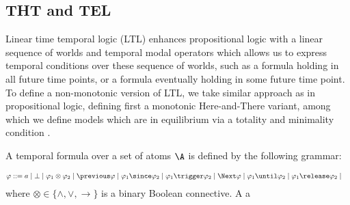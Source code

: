 \subsection{THT and TEL}

Linear time temporal logic (LTL) enhances propositional logic with a
linear sequence of worlds and temporal modal operators which allows us
to express temporal conditions over these sequence of worlds, such as
a formula holding in all future time points, or a formula eventually
holding in some future time point. To define a non-monotonic version
of LTL, we take similar approach as in propositional logic, defining
first a monotonic Here-and-There variant, among which we define models
which are in equilibrium via a totality and minimality condition
\cite{agcadipescscvi20a}.

A temporal formula over a set of atoms $\A$ is defined by the
following grammar:

\begin{align*}
    \varphi ::= &\; a \mid \bot \mid
                  \varphi_1 \otimes \varphi_2 \mid
                  \previous \varphi \mid \varphi_1 \since \varphi_2 \mid \varphi_1 \trigger \varphi_2 \mid
                  \Next \varphi \mid \varphi_1 \until \varphi_2 \mid \varphi_1 \release \varphi_2 \mid                  
\end{align*}
where $\otimes \in \{ \wedge, \vee, \to \}$ is a binary Boolean
connective. A a

